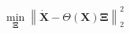 \documentclass[preview]{standalone}
\begin{document}
\begin{align*}
\min_{\mathbf{\Xi}} \left\| \dot{\mathbf{X}} - \Theta(\mathbf{X}) \mathbf{\Xi} \right\|_2^2
\end{align*}
\end{document}
